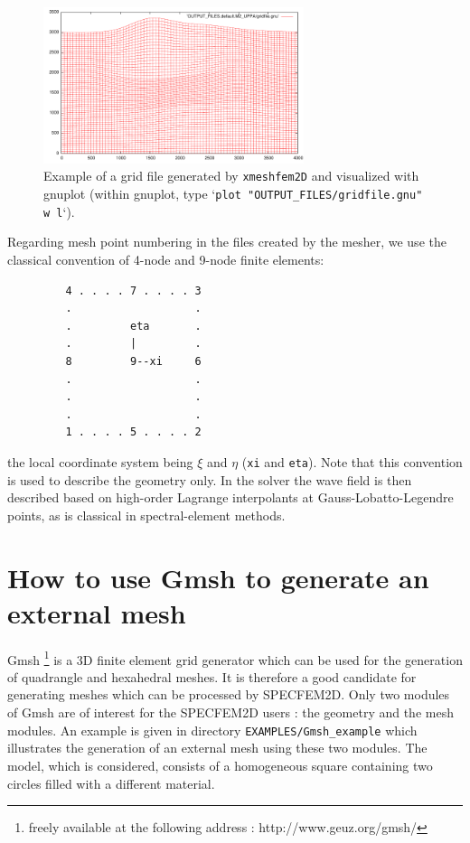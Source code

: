 \documentclass[oneside,english,onecolumn,letterpaper]{book}
\begin{document}
\begin{figure}[htbp]
\noindent \begin{centering}
\includegraphics[width=3in]{figures/example-gridfile.pdf}
\par\end{centering}
\caption{Example of a grid file generated by \texttt{xmeshfem2D} and visualized with gnuplot
(within gnuplot, type `\texttt{plot "OUTPUT\_FILES/gridfile.gnu" w l}`).}
\label{fig:example.mesh}
\end{figure}

Regarding mesh point numbering in the files created by the mesher, we use the classical convention of 4-node and 9-node finite elements:
\begin{verbatim}
         4 . . . . 7 . . . . 3
         .                   .
         .         eta       .
         .         |         .
         8         9--xi     6
         .                   .
         .                   .
         .                   .
         1 . . . . 5 . . . . 2
\end{verbatim}
\noindent
the local coordinate system being $\xi$ and $\eta$ (\texttt{xi} and \texttt{eta}).
Note that this convention is used to describe the geometry only. In the solver the wave field is then described based on high-order Lagrange interpolants
at Gauss-Lobatto-Legendre points, as is classical in spectral-element methods.

\section{How to use Gmsh to generate an external mesh}

Gmsh%
\footnote{freely available at the following address : http://www.geuz.org/gmsh/%
} is a 3D finite element grid generator which can be used for the generation
of quadrangle and hexahedral meshes. It is therefore a good candidate
for generating meshes which can be processed by SPECFEM2D. Only two
modules of Gmsh are of interest for the SPECFEM2D users : the geometry
and the mesh modules. An example is given in directory \texttt{EXAMPLES/Gmsh\_example}
which illustrates the generation of an external mesh using these two
modules. The model, which is considered, consists of a homogeneous
square containing two circles filled with a different material.
\end{document}
